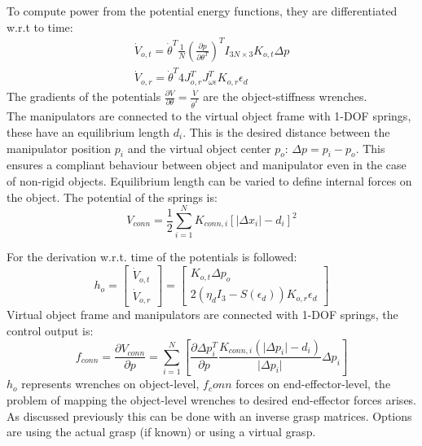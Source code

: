 \documentclass[conference]{IEEEtran}
\begin{document}
To compute power from the potential energy functions, they are differentiated w.r.t to time:
\begin{subequations}
\begin{align}
\dot{V}_{o,t} = \dot{\theta}^T\frac{1}{N}\left(\frac{\partial p}{\partial\theta^T}\right)^T I_{3N\times 3} K_{o,t}\Delta p\\
\dot{V}_{o,r} = \dot{\theta}^T 4 J_{o,r}^T J_{\omega\epsilon}^T K_{o,r} \epsilon_d
\end{align}
\end{subequations}
The gradients of the potentials $ \frac{\partial V}{\partial \theta} = \frac{\dot{V}}{\dot{\theta}^T} $ are the object-stiffness wrenches.\\
The manipulators are connected to the virtual object frame with 1-DOF springs, these have an equilibrium length $ d_i $. This is the desired distance between the manipulator position $ p_i $ and the virtual object center $ p_o $: $ \Delta p = p_i - p_o $. This ensures a compliant behaviour between object and manipulator even in the case of non-rigid objects. Equilibrium length can be varied to define internal forces on the object. The potential of the springs is:
\begin{equation}
V_{conn} = \dfrac{1}{2} \sum_{i=1}^N K_{conn,i} \left[ \vert\Delta x_i \vert - d_i \right]^2
\end{equation}

 
For the derivation w.r.t. time of the potentials \cite{Natale2003} is followed: 
\begin{equation}
h_o = \begin{bmatrix}\dot{V}_{o,t} \\ \dot{V}_{o,r}\end{bmatrix} = \begin{bmatrix} K_{o,t}\Delta p_o\\2(\eta_d I_3 - S(\epsilon_d))K_{o,r}\epsilon_d\end{bmatrix}
\end{equation}
Virtual object frame and manipulators are connected with 1-DOF springs, the control output is:
\begin{equation}
f_{conn} = \dfrac{\partial V_{conn}}{\partial p} = \sum_{i=1}^N\left[\dfrac{\partial\Delta p_i^T}{\partial p}\dfrac{K_{conn,i}(\vert\Delta p_i\vert - d_i)}{\vert\Delta p_i\vert}\Delta p_i\right] 
\end{equation}
$ h_o $ represents wrenches on object-level, $ f_conn $ forces on end-effector-level, the problem of mapping the object-level wrenches to desired end-effector forces arises. As discussed previously this can be done with an inverse grasp matrices. Options are using the actual grasp (if known) or using a virtual grasp.  
\end{document}
